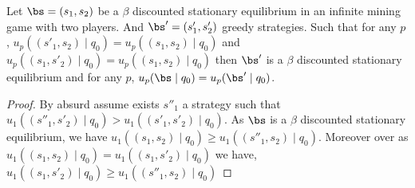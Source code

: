 \begin{mylem}
	Let $\bs = (s_1,s_2)$ be a $\beta$ discounted stationary equilibrium in an infinite mining game with two players.  And $\bs' = (s'_1,s'_2)$ greedy strategies. Such that for any $p$, 
	$u_p((s'_1,s_2) \mid q_0) = u_p((s_1,s_2) \mid q_0)$ and $u_p((s_1,s'_2) \mid q_0) = u_p((s_1,s_2) \mid q_0)$ then $\bs'$ is a $\beta$ discounted stationary equilibrium and for any $p$, $u_p(\bs \mid q_0) = u_p(\bs' \mid q_0)$.
\end{mylem}
\begin{proof}
	By absurd assume exists $s''_1$ a strategy  such that $u_1((s''_1,s'_2) \mid q_0) > u_1((s'_1,s'_2) \mid q_0)$. As $\bs$ is a  $\beta$ discounted stationary equilibrium, we have $u_1((s_1,s_2)\mid q_0) \geq u_1((s''_1,s_2)\mid q_0)$. Moreover over as $u_1((s_1,s_2)\mid q_0) = u_1((s_1,s'_2)\mid q_0)$ we have, $u_1((s_1,s'_2)\mid q_0) \geq u_1((s''_1,s_2)\mid q_0)$
\end{proof}
\fi
\iffalse
\etienne{What i am currently working on : }
\begin{myprop}
	Let $\bs = (s_1,s_2)$ a $\beta$ discounted nash equilibrium then $\bs$ is greedy.
\end{myprop}
\begin{proof}
	Let $q$ a state. Let $L \in q$ a list. We denote by $\#(p1,L)$ the number of block own by $p1$ in $L$. Notice that  $\#(p1,L) + \#(p2,L) = |L|$.
	
	By absurd, let $q$ a state such that $s_1(q) = L$ and exists a state $q'$ such that $s_1(q)(q) \subseteq q'$ and $|s_1(q')| < |L|$.
	Let $q'$ one of the first, hence a element such that for all $q''$ , $q'' \subseteq q'$ implies that $s_1(q'') \geq |L|$ .
	
	Hence we have that $\#(p_1, L' \cap q) = \#(p_1, L')$
	\begin{itemize}
		\item suppose that $\#(p_1, L') \geq \#(p_1, L)$ 
		\item suppose that $\#(p_1, L') > \#(p_1, L)$ 
			Then $\#(p_2, L') \leq \#(p_2, L)$
		So $p_2$ will not mine on it, and i exclude it too (next step of the proof)
	\end{itemize}

	\begin{mylem}
		Let $s_1,s_2$ a pair of strategy.
		Let $q$ a state such that $s_1(q) = L$ and exists $L' \in q$ such that $\#(p_1, L') \geq \#(p_1, L)$ and $|L'| \geq |L|$ then exists $s$ such that $u_1((s,s_2),q_0) > u_1((s_1,s_2),q_0)$
	\end{mylem}
\end{proof}
\fi




